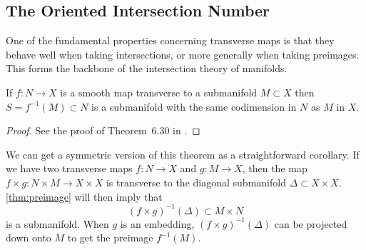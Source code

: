 \subsection{The Oriented Intersection Number}

One of the fundamental properties concerning transverse maps is that they behave well when taking intersections, or more generally when taking preimages. This forms the backbone of the intersection theory of manifolds.

\begin{theorem}\label{thm:preimage}
	If $f : N \to X$ is a smooth map transverse to a submanifold $M\subset X$ then $S=f^{-1}(M)\subset N$ is a submanifold with the same codimension in $N$ as $M$ in $X$.
\end{theorem}
\begin{proof}
	See the proof of Theorem~6.30 in \cite{lee2012smooth}.
\end{proof}

\begin{remark}\label{rmk:symmetric-preimage-theorem}
	We can get a symmetric version of this theorem as a straightforward corollary. If we have two transverse maps $f : N\to X$ and $g : M\to X$, then the map $f\times g : N\times M \to X\times X$ is transverse to the diagonal submanifold $\Delta\subset X\times X$. \cref{thm:preimage} will then imply that
	\[
		(f\times g)^{-1}(\Delta) \subset M\times N
	\]
	is a submanifold. When $g$ is an embedding, $(f\times g)^{-1}(\Delta)$ can be projected down onto $M$ to get the preimage $f^{-1}(M)$.
\end{remark}

